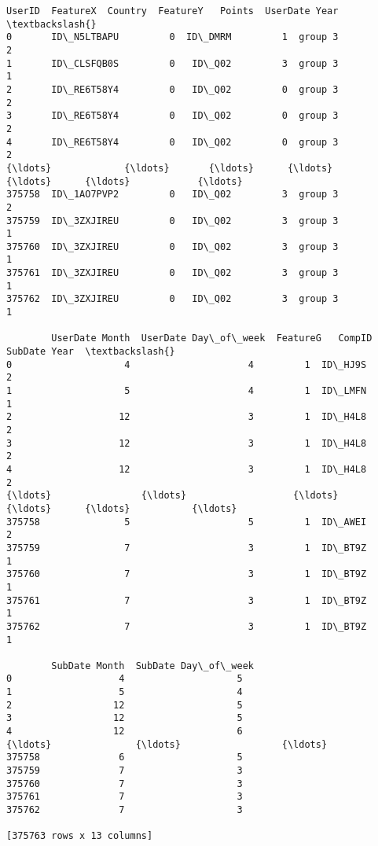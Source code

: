 \documentclass{report}
\makeatletter
\newcommand{\boxspacing}{\kern\kvtcb@left@rule\kern\kvtcb@boxsep}
\newcommand{\prompt}[4]{
        \ttfamily\llap{{\color{#2}[#3]:\hspace{3pt}#4}}\vspace{-\baselineskip}
    }
\makeatother
\begin{document}
            \begin{tcolorbox}[breakable, size=fbox, boxrule=.5pt, pad at break*=1mm, opacityfill=0]
\prompt{Out}{outcolor}{3}{\boxspacing}
\begin{Verbatim}[commandchars=\\\{\}]
             UserID  FeatureX  Country  FeatureY   Points  UserDate Year  \textbackslash{}
0       ID\_N5LTBAPU         0  ID\_DMRM         1  group 3              2
1       ID\_CLSFQB0S         0   ID\_Q02         3  group 3              1
2       ID\_RE6T58Y4         0   ID\_Q02         0  group 3              2
3       ID\_RE6T58Y4         0   ID\_Q02         0  group 3              2
4       ID\_RE6T58Y4         0   ID\_Q02         0  group 3              2
{\ldots}             {\ldots}       {\ldots}      {\ldots}       {\ldots}      {\ldots}            {\ldots}
375758  ID\_1AO7PVP2         0   ID\_Q02         3  group 3              2
375759  ID\_3ZXJIREU         0   ID\_Q02         3  group 3              1
375760  ID\_3ZXJIREU         0   ID\_Q02         3  group 3              1
375761  ID\_3ZXJIREU         0   ID\_Q02         3  group 3              1
375762  ID\_3ZXJIREU         0   ID\_Q02         3  group 3              1

        UserDate Month  UserDate Day\_of\_week  FeatureG   CompID  SubDate Year  \textbackslash{}
0                    4                     4         1  ID\_HJ9S             2
1                    5                     4         1  ID\_LMFN             1
2                   12                     3         1  ID\_H4L8             2
3                   12                     3         1  ID\_H4L8             2
4                   12                     3         1  ID\_H4L8             2
{\ldots}                {\ldots}                   {\ldots}       {\ldots}      {\ldots}           {\ldots}
375758               5                     5         1  ID\_AWEI             2
375759               7                     3         1  ID\_BT9Z             1
375760               7                     3         1  ID\_BT9Z             1
375761               7                     3         1  ID\_BT9Z             1
375762               7                     3         1  ID\_BT9Z             1

        SubDate Month  SubDate Day\_of\_week
0                   4                    5
1                   5                    4
2                  12                    5
3                  12                    5
4                  12                    6
{\ldots}               {\ldots}                  {\ldots}
375758              6                    5
375759              7                    3
375760              7                    3
375761              7                    3
375762              7                    3

[375763 rows x 13 columns]
\end{Verbatim}
\end{tcolorbox}
        
\end{document}
